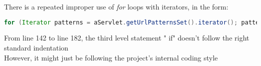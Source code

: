 There is a repeated improper use of \textit{for} loops with iterators, in the form:

\begin{lstlisting}[language=Java, breaklines=true]
  for (Iterator patterns = aServlet.getUrlPatternsSet().iterator(); patterns.hasNext();)
\end{lstlisting}


From line 142 to line 182, the third level statement " if" doesn't follow the right standard indentation\\

However, it might just be following the project's internal coding style